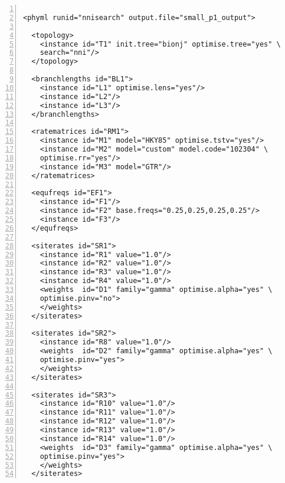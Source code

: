 \documentclass[a4paper,12pt]{article}
\begin{document}
\vspace{0.2cm}
\begin{Verbatim}[frame=single, label=Example of PhyML XML file, samepage=true, baselinestretch=0.5,
  fontsize=\small, numbers=left]

<phyml runid="nnisearch" output.file="small_p1_output">

  <topology>
    <instance id="T1" init.tree="bionj" optimise.tree="yes" \
    search="nni"/>
  </topology>
  
  <branchlengths id="BL1">
    <instance id="L1" optimise.lens="yes"/>
    <instance id="L2"/>
    <instance id="L3"/>
  </branchlengths>

  <ratematrices id="RM1">
    <instance id="M1" model="HKY85" optimise.tstv="yes"/>
    <instance id="M2" model="custom" model.code="102304" \
    optimise.rr="yes"/>
    <instance id="M3" model="GTR"/>
  </ratematrices>
  
  <equfreqs id="EF1">
    <instance id="F1"/>
    <instance id="F2" base.freqs="0.25,0.25,0.25,0.25"/>
    <instance id="F3"/>
  </equfreqs>

  <siterates id="SR1">
    <instance id="R1" value="1.0"/>
    <instance id="R2" value="1.0"/>
    <instance id="R3" value="1.0"/>
    <instance id="R4" value="1.0"/>
    <weights  id="D1" family="gamma" optimise.alpha="yes" \
    optimise.pinv="no">
    </weights>
  </siterates>

  <siterates id="SR2">
    <instance id="R8" value="1.0"/>
    <weights  id="D2" family="gamma" optimise.alpha="yes" \
    optimise.pinv="yes">
    </weights>
  </siterates>
  
  <siterates id="SR3">
    <instance id="R10" value="1.0"/>
    <instance id="R11" value="1.0"/>
    <instance id="R12" value="1.0"/>
    <instance id="R13" value="1.0"/>
    <instance id="R14" value="1.0"/>
    <weights  id="D3" family="gamma" optimise.alpha="yes" \
    optimise.pinv="yes">
    </weights>
  </siterates>

\end{Verbatim}
\end{document}
